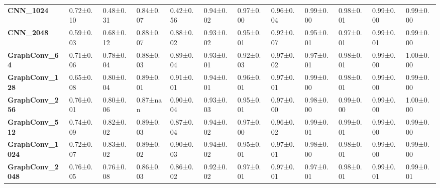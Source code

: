 \begin{tabular}{llllllllllll}
\textbf{CNN\_1024      } &   0.72±0.10 &  0.48±0.31 &  0.84±0.07 &  0.42±0.56 &  0.94±0.02 &  0.97±0.00 &  0.96±0.04 &  0.99±0.00 &  0.98±0.01 &   0.99±0.00 &   0.99±0.00 \\
\textbf{CNN\_2048      } &   0.59±0.03 &  0.68±0.12 &  0.88±0.07 &  0.88±0.02 &  0.93±0.02 &  0.95±0.01 &  0.92±0.07 &  0.95±0.01 &  0.97±0.01 &   0.99±0.01 &   0.99±0.00 \\
\textbf{GraphConv\_64  } &   0.71±0.06 &  0.78±0.04 &  0.88±0.03 &  0.89±0.04 &  0.93±0.01 &  0.92±0.03 &  0.97±0.02 &  0.97±0.01 &  0.98±0.01 &   0.99±0.00 &   1.00±0.00 \\
\textbf{GraphConv\_128 } &   0.65±0.08 &  0.80±0.04 &  0.89±0.01 &  0.91±0.01 &  0.94±0.01 &  0.96±0.01 &  0.97±0.01 &  0.99±0.00 &  0.98±0.01 &   0.99±0.00 &   0.99±0.00 \\
\textbf{GraphConv\_256 } &   0.76±0.01 &  0.80±0.06 &   0.87±nan &  0.90±0.04 &  0.93±0.03 &  0.95±0.01 &  0.97±0.00 &  0.98±0.00 &  0.99±0.00 &   0.99±0.00 &   1.00±0.00 \\
\textbf{GraphConv\_512 } &   0.74±0.09 &  0.82±0.02 &  0.89±0.03 &  0.87±0.04 &  0.94±0.02 &  0.97±0.00 &  0.96±0.02 &  0.99±0.01 &  0.99±0.01 &   0.99±0.00 &   0.99±0.00 \\
\textbf{GraphConv\_1024} &   0.72±0.07 &  0.83±0.02 &  0.89±0.02 &  0.90±0.03 &  0.94±0.02 &  0.95±0.01 &  0.97±0.01 &  0.98±0.00 &  0.98±0.01 &   0.99±0.00 &   0.99±0.00 \\
\textbf{GraphConv\_2048} &   0.76±0.05 &  0.76±0.08 &  0.86±0.03 &  0.86±0.02 &  0.92±0.02 &  0.97±0.01 &  0.97±0.01 &  0.97±0.01 &  0.98±0.01 &   0.99±0.01 &   0.99±0.01 \\
\bottomrule
\end{tabular}
